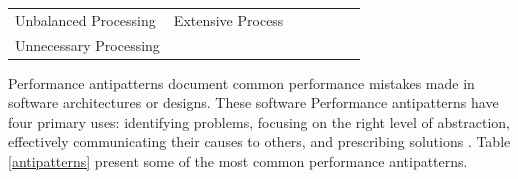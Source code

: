 \documentclass[espaco=umemeio,chapter=TITLE,twoside,openright]{abnt}
\begin{document}
\begin{table}[!h]
\begin{tabular}{|l|l|l|llll}
\multirow{-4}{*}{Unbalanced Processing} & Extensive Process            & \begin{minipage}{0.4\textwidth} \cite{Vetoio2011} \cite{Smith2003}   \end{minipage}                                                                           &  &  &  &  \\ \cline{1-3}
Unnecessary Processing                  &                              & \cite{Smith2003}                                                                                               &  &  &  &  \\ \cline{1-3}
\end{tabular}
\end{table}




Performance antipatterns document common performance mistakes made in software architectures or designs. These software Performance antipatterns have four primary uses: identifying problems,
focusing on the
right level of abstraction,
effectively communicating
their causes to others, and prescribing solutions \cite{brown1998antipatterns}. Table \ref{antipatterns} present some of the most common performance antipatterns.


\end{document}
